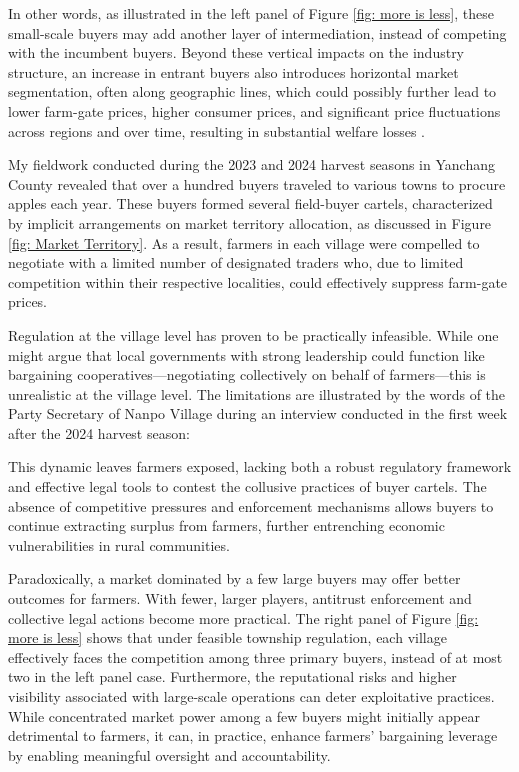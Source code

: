 In other words, as illustrated in the left panel of Figure \ref{fig: more is less}, these small-scale buyers may add another layer of intermediation, instead of competing with the incumbent buyers. Beyond these vertical impacts on the industry structure, an increase in entrant buyers also introduces horizontal market segmentation, often along geographic lines, which could possibly further lead to lower farm-gate prices, higher consumer prices, and significant price fluctuations across regions and over time, resulting in substantial welfare losses \citep{bergquist_McIntosh_2024}.


My fieldwork conducted during the 2023 and 2024 harvest seasons in Yanchang County revealed that over a hundred buyers traveled to various towns to procure apples each year. These buyers formed several field-buyer cartels, characterized by implicit arrangements on market territory allocation, as discussed in Figure \ref{fig: Market Territory}. As a result, farmers in each village were compelled to negotiate with a limited number of designated traders who, due to limited competition within their respective localities, could effectively suppress farm-gate prices.

Regulation at the village level has proven to be practically infeasible. While one might argue that local governments with strong leadership could function like bargaining cooperatives—negotiating collectively on behalf of farmers—this is unrealistic at the village level. The limitations are illustrated by the words of the Party Secretary of Nanpo Village during an interview conducted in the first week after the 2024 harvest season:

\begin{quote}  \end{quote}

This dynamic leaves farmers exposed, lacking both a robust regulatory framework and effective legal tools to contest the collusive practices of buyer cartels. The absence of competitive pressures and enforcement mechanisms allows buyers to continue extracting surplus from farmers, further entrenching economic vulnerabilities in rural communities.


Paradoxically, a market dominated by a few large buyers may offer better outcomes for farmers. With fewer, larger players, antitrust enforcement and collective legal actions become more practical. The right panel of Figure \ref{fig: more is less} shows that under feasible township regulation, each village effectively faces the competition among three primary buyers, instead of at most two in the left panel case. Furthermore, the reputational risks and higher visibility associated with large-scale operations can deter exploitative practices. While concentrated market power among a few buyers might initially appear detrimental to farmers, it can, in practice, enhance farmers' bargaining leverage by enabling meaningful oversight and accountability.

